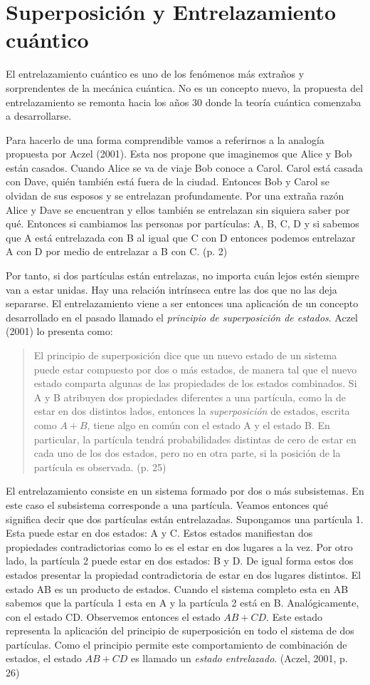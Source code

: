 \documentclass[11pt,a4paper]{article}
\begin{document}
\section*{Superposición y Entrelazamiento cuántico}
El entrelazamiento cuántico es uno de los fenómenos más extraños y sorprendentes de la mecánica cuántica. No es un concepto nuevo, la propuesta del entrelazamiento se remonta hacia los años 30 donde la teoría cuántica comenzaba a desarrollarse. 

Para hacerlo de una forma comprendible vamos a referirnos a la analogía propuesta por Aczel (2001). Esta nos propone que imaginemos que Alice y Bob están casados. Cuando Alice se va de viaje Bob conoce a Carol. Carol está casada con Dave, quién también está fuera de la ciudad. Entonces Bob y Carol se olvidan de sus esposos y se entrelazan profundamente. Por una extraña razón Alice y Dave se encuentran y ellos también se entrelazan sin siquiera saber por qué. Entonces si cambiamos las personas por partículas: A, B, C, D y si sabemos que A está entrelazada con B al igual que C con D  entonces podemos entrelazar A con D por medio de entrelazar a B con C. (p. 2)

Por tanto, si dos partículas están entrelazas, no importa cuán lejos estén siempre van a estar unidas. Hay una relación intrínseca entre las dos que no las deja separarse. El entrelazamiento viene a ser entonces una aplicación de un concepto desarrollado en el pasado llamado el \textit{principio de superposición de estados}. Aczel (2001) lo presenta como:
\begin{quote}
El principio de superposición dice que un nuevo estado de un sistema puede estar compuesto por dos o más estados, de manera tal que el nuevo estado comparta algunas de las propiedades de los estados combinados. Si A y B atribuyen dos propiedades diferentes a una partícula, como la de estar en dos distintos lados, entonces la \textit{superposición} de estados, escrita como $A + B$, tiene algo en común con el estado A y el estado B. En particular, la partícula tendrá probabilidades distintas de cero de estar en cada uno de los dos estados, pero no en otra parte, si la posición de la partícula es observada. (p. 25)
\end{quote}
El entrelazamiento consiste en un sistema formado por dos o más subsistemas. En este caso el subsistema corresponde a una partícula. Veamos entonces qué significa decir que dos partículas están entrelazadas. Supongamos una partícula 1. Esta puede estar en dos estados: A y C. Estos estados manifiestan dos propiedades contradictorias como lo es el estar en dos lugares a la vez. Por otro lado, la partícula 2 puede estar en dos estados: B y D. De igual forma estos dos estados presentar la propiedad contradictoria de estar en dos lugares distintos. El estado AB es un producto de estados. Cuando el sistema completo esta en AB sabemos que la partícula 1 esta en A y la partícula 2 está en B. Analógicamente, con el estado CD. Observemos entonces el estado $AB + CD$. Este estado representa la aplicación del principio de superposición en todo el sistema de dos partículas. Como el principio permite este comportamiento de combinación de estados, el estado $AB + CD$ es llamado un \textit{estado entrelazado}. (Aczel, 2001, p. 26)
\end{document}
